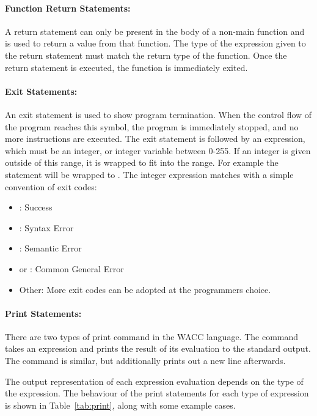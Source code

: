 \documentclass[a4paper]{article}
\theoremstyle{definition}
\newtheorem{question}{Gap}
\newcommand{\fillgap}[2]{
  \begin{center}
  \fbox{
    \begin{minipage}{4in}
      \begin{question}
        {\it #1} \hfill ({\bf #2})
      \end{question}
    \end{minipage}
  }
\end{center}
}
\begin{document}
\paragraph{Function Return Statements:}
A return statement can only be present in the body of a non-main function and is used to return a value from that function. 
The type of the expression given to the return statement must match the return type of the function. 
Once the return statement is executed, the function is immediately exited.

\paragraph{Exit Statements:}

\fillgap{DONE \ref{tab:print}}{3 marks}

An exit statement is used to show program termination. 
When the control flow of the program reaches this symbol, the program is immediately stopped, and no more instructions are executed.
The exit statement is followed by an expression, which must be an integer, or integer variable between 0-255. 
If an integer is given outside of this range, it is wrapped to fit into the range.
For example the statement  will be wrapped to .
The integer expression matches with a simple convention of exit codes:
\begin{itemize}
  \item {}: Success
  \item {}: Syntax Error
  \item {}: Semantic Error
  \item {} or : Common General Error
  \item Other: More exit codes can be adopted at the programmers choice.
\end{itemize}

\paragraph{Print Statements:}
There are two types of print command in the WACC language.
The  command takes an expression and prints the result of its evaluation to the standard output.
The  command is similar, but additionally prints out a new line afterwards.

The output representation of each expression evaluation depends on the type of the expression.
The behaviour of the print statements for each type of expression is shown in Table~\ref{tab:print}, along with some example cases.
\end{document}
